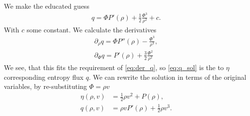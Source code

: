 We make the educated guess 
\begin{align}
q=\Phi P'(\rho) +\frac 12 \frac{\Phi^3}{\rho^2} +c.\label{eq:q_sol}
\end{align}
With $c$ some constant.
We calculate the derivatives 
\begin{align}
\partial_\rho q = \Phi P''(\rho) - \frac{\Phi^3}{\rho^3},\\
\partial_\Phi q = P'(\rho) +\frac 32 \frac{\Phi^2}{\rho^2}
\end{align}
We see, that this fits the requirement of \cref{eq:der_q}, so \cref{eq:q_sol} is the to $\eta$ corresponding entropy flux $q$.
We can rewrite the solution in terms of the original variables, by re-substituting $\Phi=\rho v$
\begin{align}
\eta(\rho,v)&=\frac 12 \rho v^2 +P(\rho),\\
 q(\rho,v)&= \rho v P'(\rho) + \frac 12 \rho v^3.
\end{align}